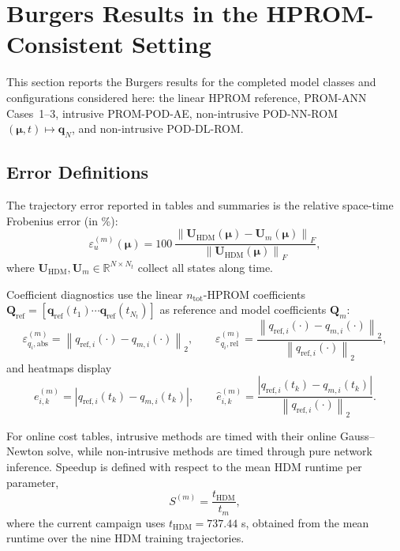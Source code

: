 \documentclass[11pt]{article}
\begin{document}
\section{Burgers Results in the HPROM-Consistent Setting}
\label{sec:burgers-results}

This section reports the Burgers results for the completed model classes and
configurations considered here: the linear HPROM reference, PROM-ANN
Cases~1--3, intrusive PROM-POD-AE, non-intrusive POD-NN-ROM
$(\bm\mu,t)\mapsto\mathbf q_N$, and non-intrusive POD-DL-ROM.

\subsection{Error Definitions}

The trajectory error reported in tables and summaries is the relative space-time
Frobenius error (in \%):
\begin{equation}
\varepsilon_u^{(m)}(\bm\mu)
=
100\,
\frac{\left\|
\mathbf U_{\mathrm{HDM}}(\bm\mu)-\mathbf U_m(\bm\mu)
\right\|_F}
{\left\|
\mathbf U_{\mathrm{HDM}}(\bm\mu)
\right\|_F},
\label{eq:traj-error-def}
\end{equation}
where $\mathbf U_{\mathrm{HDM}},\mathbf U_m\in\mathbb R^{N\times N_t}$ collect
all states along time.

Coefficient diagnostics use the linear $n_{\mathrm{tot}}$-HPROM coefficients
$\mathbf Q_{\mathrm{ref}}=[\mathbf q_{\mathrm{ref}}(t_1)\cdots\mathbf q_{\mathrm{ref}}(t_{N_t})]$
as reference and model coefficients $\mathbf Q_m$:
\begin{equation}
\varepsilon_{q_i,\mathrm{abs}}^{(m)}
=
\left\|q_{\mathrm{ref},i}(\cdot)-q_{m,i}(\cdot)\right\|_2,
\qquad
\varepsilon_{q_i,\mathrm{rel}}^{(m)}
=
\frac{\left\|q_{\mathrm{ref},i}(\cdot)-q_{m,i}(\cdot)\right\|_2}
{\left\|q_{\mathrm{ref},i}(\cdot)\right\|_2},
\label{eq:coeff-error-def}
\end{equation}
and heatmaps display
\begin{equation}
e_{i,k}^{(m)}=
\left|q_{\mathrm{ref},i}(t_k)-q_{m,i}(t_k)\right|,
\qquad
\widehat e_{i,k}^{(m)}=
\frac{\left|q_{\mathrm{ref},i}(t_k)-q_{m,i}(t_k)\right|}
{\left\|q_{\mathrm{ref},i}(\cdot)\right\|_2}.
\label{eq:heatmap-error-def}
\end{equation}

For online cost tables, intrusive methods are timed with their online
Gauss--Newton solve, while non-intrusive methods are timed through pure network
inference. Speedup is defined with respect to the mean HDM runtime per
parameter,
\begin{equation}
S^{(m)}=\frac{t_{\mathrm{HDM}}}{t_m},
\label{eq:speedup-def}
\end{equation}
where the current campaign uses $t_{\mathrm{HDM}}=737.44$ s, obtained from the
mean runtime over the nine HDM training trajectories.
\end{document}
